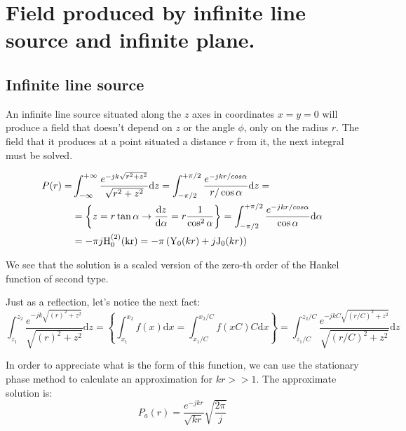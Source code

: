 \chapter{Field produced by infinite line source and infinite plane.}

\section{Infinite line source}

An infinite line source situated along the $z$ axes in coordinates $x = y = 0$ will produce a field that doesn't depend on $z$ or the angle $\phi$, only on the radius $r$. The field that it produces at a point situated a distance $r$ from it, the next integral must be solved.

\begin{equation}
\begin{aligned}
P(r) = &\int_{-\infty}^{+\infty} \frac{e^{-j k \sqrt{r^2 + z^2}}}{\sqrt{r^2 + z^2}} \mathrm{d}z = 
\int_{-\pi/2}^{+\pi/2} \frac{e^{-j k r/cos{\alpha}}}{r/\cos{\alpha}} \mathrm{d}z = \\
&= \left\{ z = r \tan{\alpha} \rightarrow \dv{z}{\alpha} = r\frac{1}{\cos^2{\alpha}} \right\} = \int_{-\pi/2}^{+\pi/2} \frac{e^{-j k r/cos{\alpha}}}{\cos{\alpha}} \mathrm{d}\alpha \\
&= -\pi j \mathrm{H_0^{(2)}(k r)} = -\pi \left( \mathrm{Y}_0(k r) + j\mathrm{J}_0(k r)\right)
\end{aligned}
\end{equation}

We see that the solution is a scaled version of the zero-th order of the Hankel function of second type.

Just as a reflection, let's notice the next fact:
\begin{equation}
\int_{z_1}^{z_2} \frac{e^{-j k \sqrt{(r)^2 + z^2}}}{\sqrt{(r)^2 + z^2}} \mathrm{d}z = \left\{ \int_{x_1}^{x_2} f(x) \mathrm{d}x = \int_{x_1/C}^{x_2/C} f(xC) C \mathrm{d}x \right\} = \int_{z_1/C}^{z_2/C} \frac{e^{-j k C \sqrt{(r/C)^2 + z^2}}}{\sqrt{(r/C)^2 + z^2}} \mathrm{d}z
\end{equation}

In order to appreciate what is the form of this function, we can use the stationary phase method to calculate an approximation for $kr >> 1$. The approximate solution is:
\begin{equation}
P_{a}(r) = \frac{e^{-jkr}}{\sqrt{kr}}\sqrt{\frac{2\pi}{j}}
\end{equation}

